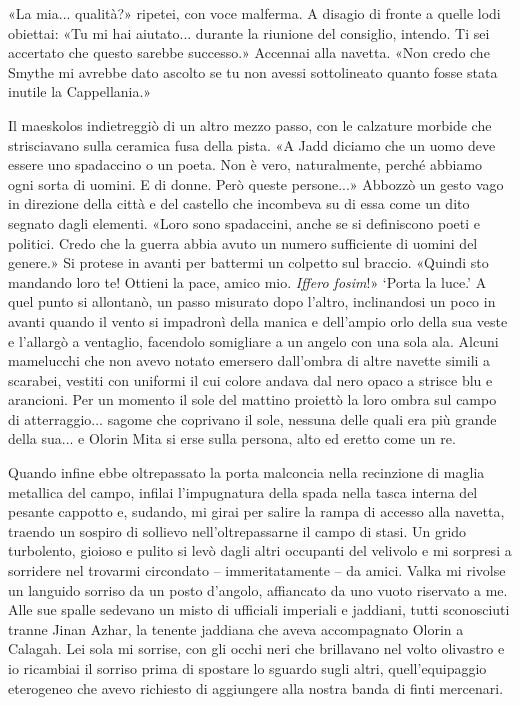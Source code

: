 «La mia... qualità?» ripetei, con voce malferma. A disagio di fronte a
quelle lodi obiettai: «Tu mi hai aiutato... durante la riunione del
consiglio, intendo. Ti sei accertato che questo sarebbe successo.»
Accennai alla navetta. «Non credo che Smythe mi avrebbe dato ascolto se
tu non avessi sottolineato quanto fosse stata inutile la Cappellania.»

Il maeskolos indietreggiò di un altro mezzo passo, con le calzature
morbide che strisciavano sulla ceramica fusa della pista. «A Jadd
diciamo che un uomo deve essere uno spadaccino o un poeta. Non è vero,
naturalmente, perché abbiamo ogni sorta di uomini. E di donne. Però
queste persone...» Abbozzò un gesto vago in direzione della città e del
castello che incombeva su di essa come un dito segnato dagli elementi.
«Loro sono spadaccini, anche se si definiscono poeti e politici. Credo
che la guerra abbia avuto un numero sufficiente di uomini del genere.»
Si protese in avanti per battermi un colpetto sul braccio. «Quindi sto
mandando loro te! Ottieni la pace, amico mio. \emph{Iffero fosim}!»
`Porta la luce.' A quel punto si allontanò, un passo misurato dopo
l'altro, inclinandosi un poco in avanti quando il vento si impadronì
della manica e dell'ampio orlo della sua veste e l'allargò a ventaglio,
facendolo somigliare a un angelo con una sola ala. Alcuni mamelucchi che
non avevo notato emersero dall'ombra di altre navette simili a scarabei,
vestiti con uniformi il cui colore andava dal nero opaco a strisce blu e
arancioni. Per un momento il sole del mattino proiettò la loro ombra sul
campo di atterraggio... sagome che coprivano il sole, nessuna delle
quali era più grande della sua... e Olorin Mita si erse sulla persona,
alto ed eretto come un re.

Quando infine ebbe oltrepassato la porta malconcia nella recinzione di
maglia metallica del campo, infilai l'impugnatura della spada nella
tasca interna del pesante cappotto e, sudando, mi girai per salire la
rampa di accesso alla navetta, traendo un sospiro di sollievo
nell'oltrepassarne il campo di stasi. Un grido turbolento, gioioso e
pulito si levò dagli altri occupanti del velivolo e mi sorpresi a
sorridere nel trovarmi circondato -- immeritatamente -- da amici. Valka
mi rivolse un languido sorriso da un posto d'angolo, affiancato da uno
vuoto riservato a me. Alle sue spalle sedevano un misto di ufficiali
imperiali e jaddiani, tutti sconosciuti tranne Jinan Azhar, la tenente
jaddiana che aveva accompagnato Olorin a Calagah. Lei sola mi sorrise,
con gli occhi neri che brillavano nel volto olivastro e io ricambiai il
sorriso prima di spostare lo sguardo sugli altri, quell'equipaggio
eterogeneo che avevo richiesto di aggiungere alla nostra banda di finti
mercenari.

